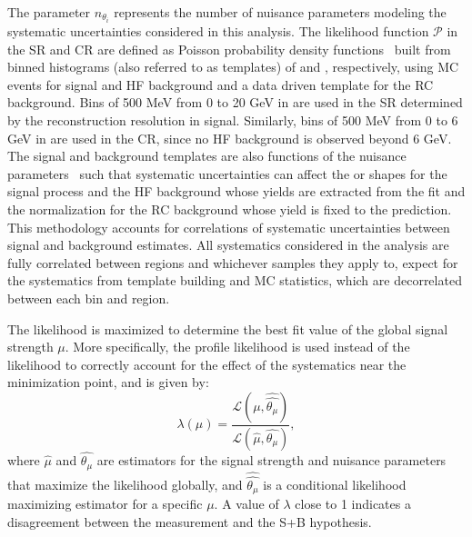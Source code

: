 The parameter $n_{\theta_i}$ represents the number of nuisance parameters modeling the systematic uncertainties considered in this analysis. The likelihood function $\mathcal{P}$ in the SR and CR are defined as Poisson probability density functions~\cite{Cranmer:1456844} built from binned histograms (also referred to as templates) of \mhnl and \mdv, respectively, using MC events for signal and HF background and a data driven template for the RC background. Bins of 500 MeV from 0 to 20 GeV in \mhnl are used in the SR determined by the \mhnl reconstruction resolution in signal. Similarly, bins of 500 MeV from 0 to 6 GeV in \mdv are used in the CR, since no HF background is observed beyond 6 GeV. The signal and background templates are also functions of the nuisance parameters~\cite{Cranmer:1456844} such that systematic uncertainties can affect the \mhnl or \mdv shapes for the signal process and the HF background whose yields are extracted from the fit and the normalization for the RC background whose yield is fixed to the prediction. This methodology accounts for correlations of systematic uncertainties between signal and background estimates. All systematics considered in the analysis are fully correlated between regions and whichever samples they apply to, expect for the systematics from template building and MC statistics, which are decorrelated between each bin and region. 

The likelihood is maximized to determine the best fit value of the global signal strength $\mu$. More specifically, the profile likelihood is used instead of the likelihood to correctly account for the effect of the systematics near the minimization point, and is given by:
\begin{equation}
    \lambda(\mu) = \frac{\mathcal{L}(\mu,\hat{\hat{\theta_\mu}})}{\mathcal{L}(\hat{\mu},\hat{\theta_\mu})},
\end{equation}
where $\hat{\mu}$ and $\hat{\theta_\mu}$ are estimators for the signal strength and nuisance parameters that maximize the likelihood globally, and $\hat{\hat{\theta_\mu}}$ is a conditional likelihood maximizing estimator for a specific $\mu$. 
A value of $\lambda$ close to 1 indicates a disagreement between the measurement and the S+B hypothesis.

